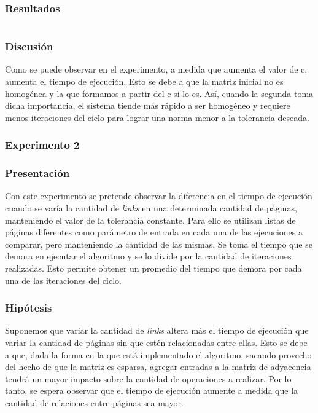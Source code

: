 
			\subsubsection*{Resultados}
				{\centering \begin{tabular}{c}
			    \end{tabular}}

			\subsubsection*{Discusión} 
			Como se puede observar en el experimento, a medida que aumenta el valor de c, aumenta el tiempo de ejecución. Esto se debe a que la matriz inicial no es homogénea y la que formamos a partir del c si lo es. Así, cuando la segunda toma dicha importancia, el sistema tiende más rápido a ser homogéneo y requiere menos iteraciones del ciclo para lograr una norma menor a la tolerancia deseada. 


		\subsubsection{Experimento 2}
			\subsubsection*{Presentación}
			Con este experimento se pretende observar la diferencia en el tiempo de ejecución cuando se varía la cantidad de \emph{links} en una determinada cantidad de páginas, manteniendo el valor de la tolerancia constante.
			Para ello se utilizan listas de páginas diferentes como parámetro de entrada en cada una de las ejecuciones a comparar, pero manteniendo la cantidad de las mismas. Se toma el tiempo que se demora en ejecutar el algoritmo y se lo divide por la cantidad de iteraciones realizadas. Esto permite obtener un promedio del tiempo que demora por cada una de las iteraciones del ciclo.
		
			\subsubsection*{Hipótesis} 
			Suponemos que variar la cantidad de \emph{links} altera más el tiempo de ejecución que variar la cantidad de páginas sin que estén relacionadas entre ellas. Esto se debe a que, dada la forma en la que está implementado el algoritmo, sacando provecho del hecho de que la matriz es esparsa, agregar entradas a la matriz de adyacencia tendrá un mayor impacto sobre la cantidad de operaciones a realizar. Por lo tanto, se espera observar que el tiempo de ejecución aumente a medida que la cantidad de relaciones entre páginas sea mayor.

